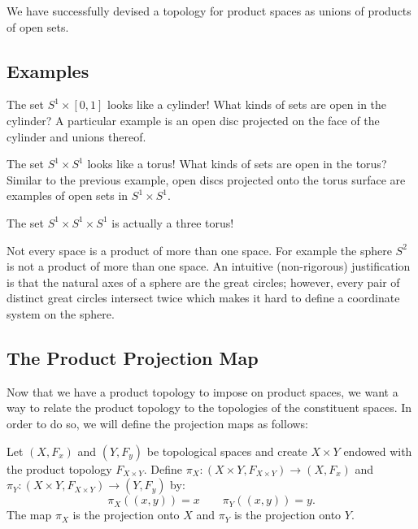 We have successfully devised a topology for product spaces as unions of products of open sets.

\subsection{Examples}
\begin{example}
	The set $S^1 \times [0,1]$ looks like a cylinder! What kinds of sets are open in the cylinder? A particular example is an open disc projected on the face of the cylinder and unions thereof. 
\end{example}

\placeholder
\begin{example}
	The set $S^1 \times S^1$ looks like a torus! What kinds of sets are open in the torus? Similar to the previous example, open discs projected onto the torus surface are examples of open sets in $S^1\times S^1$. 
\end{example}

\placeholder
\begin{example}
	The set $S^1 \times S^1 \times S^1$ is actually a three torus! 
\end{example}

\placeholder

Not every space is a product of more than one space. For example the sphere $S^2$ is not a product of more than one space. An intuitive (non-rigorous) justification is that the natural axes of a sphere are the great circles; however, every pair of distinct great circles intersect twice which makes it hard to define a coordinate system on the sphere.

\subsection{The Product Projection Map}

Now that we have a product topology to impose on product spaces, we want a way to relate the product topology to the topologies of the constituent spaces. In order to do so, we will define the projection maps as follows: 
\begin{definition}
	Let $(X,F_x)$ and $(Y,F_y)$ be topological spaces and create $X\times Y$ endowed with the product topology $F_{X\times Y}$. Define $\pi_X: (X\times Y,F_{X\times Y}) \to (X,F_x)$ and $\pi_Y:(X\times Y,F_{X\times Y}) \to (Y,F_y)$ by:
	\[\pi_X((x,y)) = x \qquad \pi_Y((x,y)) = y.\]
	The map $\pi_X$ is the projection onto $X$ and $\pi_Y$ is the projection onto $Y$. 
\end{definition}

